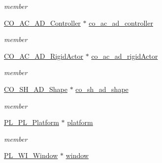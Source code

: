 \begin{DoxyCompactItemize}
\begin{DoxyCompactList}\small\item\em member \item\end{DoxyCompactList}\item 
\hypertarget{structArg_1_1Init_a914bae3f4060a87a31d55f721a5a1a73}{
\hyperlink{classContent_1_1Actor_1_1Admin_1_1Controller}{CO\_\-AC\_\-AD\_\-Controller} $\ast$ \hyperlink{structArg_1_1Init_a914bae3f4060a87a31d55f721a5a1a73}{co\_\-ac\_\-ad\_\-controller}}
\label{structArg_1_1Init_a914bae3f4060a87a31d55f721a5a1a73}

\begin{DoxyCompactList}\small\item\em member \item\end{DoxyCompactList}\item 
\hypertarget{structArg_1_1Init_aa32664615ff4bb7b5d5da2f264c3fba2}{
\hyperlink{classContent_1_1Actor_1_1Admin_1_1RigidActor}{CO\_\-AC\_\-AD\_\-RigidActor} $\ast$ \hyperlink{structArg_1_1Init_aa32664615ff4bb7b5d5da2f264c3fba2}{co\_\-ac\_\-ad\_\-rigidActor}}
\label{structArg_1_1Init_aa32664615ff4bb7b5d5da2f264c3fba2}

\begin{DoxyCompactList}\small\item\em member \item\end{DoxyCompactList}\item 
\hypertarget{structArg_1_1Init_affbe2dff01a1626314c4ac21cbbfd47e}{
\hyperlink{classContent_1_1Shape_1_1Admin_1_1Shape}{CO\_\-SH\_\-AD\_\-Shape} $\ast$ \hyperlink{structArg_1_1Init_affbe2dff01a1626314c4ac21cbbfd47e}{co\_\-sh\_\-ad\_\-shape}}
\label{structArg_1_1Init_affbe2dff01a1626314c4ac21cbbfd47e}

\begin{DoxyCompactList}\small\item\em member \item\end{DoxyCompactList}\item 
\hypertarget{structArg_1_1Init_ad2f35290ad90a2cc82c0e66d5a865a37}{
\hyperlink{classPlatform_1_1Platform_1_1Platform}{PL\_\-PL\_\-Platform} $\ast$ \hyperlink{structArg_1_1Init_ad2f35290ad90a2cc82c0e66d5a865a37}{platform}}
\label{structArg_1_1Init_ad2f35290ad90a2cc82c0e66d5a865a37}

\begin{DoxyCompactList}\small\item\em member \item\end{DoxyCompactList}\item 
\hypertarget{structArg_1_1Init_ad9b915d0453b3376fe50af6bdf67b1e7}{
\hyperlink{classPlatform_1_1Window_1_1Window}{PL\_\-WI\_\-Window} $\ast$ \hyperlink{structArg_1_1Init_ad9b915d0453b3376fe50af6bdf67b1e7}{window}}
\label{structArg_1_1Init_ad9b915d0453b3376fe50af6bdf67b1e7}


\end{DoxyCompactItemize}
